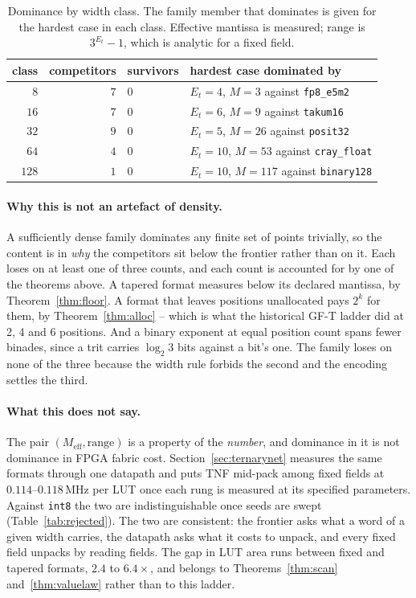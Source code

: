 \documentclass[11pt]{article}
\theoremstyle{definition}
\begin{document}
\begin{table}[t]\centering
\caption{Dominance by width class. The family member that dominates is given for
the hardest case in each class. Effective mantissa is measured; range is
$3^{E_t}-1$, which is analytic for a fixed field.}
\label{tab:nosurvivors}
\begin{tabular}{rrll}
\toprule
class & competitors & survivors & hardest case dominated by \\
\midrule
$8$   & $7$ & $0$ & $E_t{=}4$, $M{=}3$ against \texttt{fp8\_e5m2} \\
$16$  & $7$ & $0$ & $E_t{=}6$, $M{=}9$ against \texttt{takum16} \\
$32$  & $9$ & $0$ & $E_t{=}5$, $M{=}26$ against \texttt{posit32} \\
$64$  & $4$ & $0$ & $E_t{=}10$, $M{=}53$ against \texttt{cray\_float} \\
$128$ & $1$ & $0$ & $E_t{=}10$, $M{=}117$ against \texttt{binary128} \\
\bottomrule
\end{tabular}
\end{table}

\paragraph{Why this is not an artefact of density.} A sufficiently dense family
dominates any finite set of points trivially, so the content is in \emph{why} the
competitors sit below the frontier rather than on it. Each loses on at least one
of three counts, and each count is accounted for by one of the theorems above. A tapered format
measures below its declared mantissa, by Theorem~\ref{thm:floor}. A format that
leaves positions unallocated pays $2^k$ for them, by Theorem~\ref{thm:alloc} --
which is what the historical GF-T ladder did at 2, 4 and 6 positions. And a binary
exponent at equal position count spans fewer binades, since a trit carries
$\log_2 3$ bits against a bit's one. The family loses on none of the three because
the width rule forbids the second and the encoding settles the third.

\paragraph{What this does not say.} The pair $(M_{\mathrm{eff}}, \text{range})$ is
a property of the \emph{number}, and dominance in it is not dominance in FPGA fabric cost.
Section~\ref{sec:ternarynet} measures the same formats through one datapath and
puts TNF mid-pack among fixed fields at $0.114$--$0.118$\,MHz per LUT once
each rung is measured at its specified parameters. Against
\texttt{int8} the two are indistinguishable once seeds are swept
(Table~\ref{tab:rejected}). The two are consistent: the frontier asks what a word of
a given width carries, the datapath asks what it costs to unpack, and every fixed
field unpacks by reading fields. The gap in LUT area runs between fixed and tapered
formats, $2.4$ to $6.4\times$, and belongs to Theorems~\ref{thm:scan}
and~\ref{thm:valuelaw} rather than to this ladder.
\end{document}

